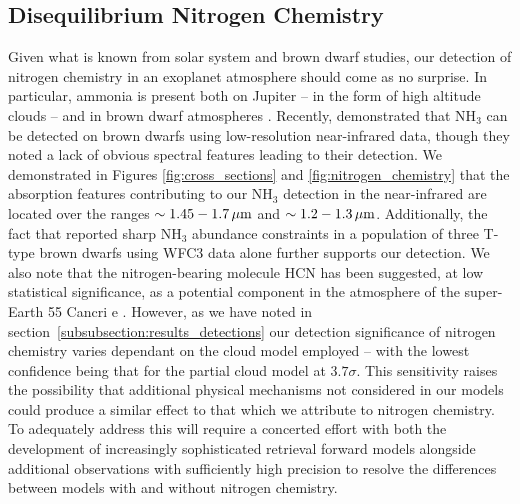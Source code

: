 \documentclass[fleqn,usenatbib]{mnras}
\begin{document}
\subsection{Disequilibrium Nitrogen Chemistry}

Given what is known from solar system and brown dwarf studies, our detection of nitrogen chemistry in an exoplanet atmosphere should come as no surprise. In particular, ammonia is present both on Jupiter -- in the form of high altitude clouds \citep{Sato1979} -- and in brown dwarf atmospheres \citep[e.g.][]{Roellig2004,Saumon2006,Cushing2008}. Recently, \citet{Line2015} demonstrated that NH$_3$ can be detected on brown dwarfs using low-resolution near-infrared data, though they noted a lack of obvious spectral features leading to their detection. We demonstrated in Figures \ref{fig:cross_sections} and \ref{fig:nitrogen_chemistry} that the absorption features contributing to our NH$_3$ detection in the near-infrared are located over the ranges $\sim 1.45-1.7 \,\hbox{$\mu$m}$ and $\sim 1.2-1.3 \,\hbox{$\mu$m}$. Additionally, the fact that \citet{Madhusudhan2016b} reported sharp NH$_3$ abundance constraints in a population of three T-type brown dwarfs using WFC3 data alone further supports our detection. We also note that the nitrogen-bearing molecule HCN has been suggested, at low statistical significance, as a potential component in the atmosphere of the super-Earth 55 Cancri e \citep{Tsiaras2016b}. However, as we have noted in section~\ref{subsubsection:results_detections} our detection significance of nitrogen chemistry varies dependant on the cloud model employed -- with the lowest confidence being that for the partial cloud model at $3.7 \sigma$. This sensitivity raises the possibility that additional physical mechanisms not considered in our models could produce a similar effect to that which we attribute to nitrogen chemistry. To adequately address this will require a concerted effort with both the development of increasingly sophisticated retrieval forward models alongside additional observations with sufficiently high precision to resolve the differences between models with and without nitrogen chemistry.
\end{document}
